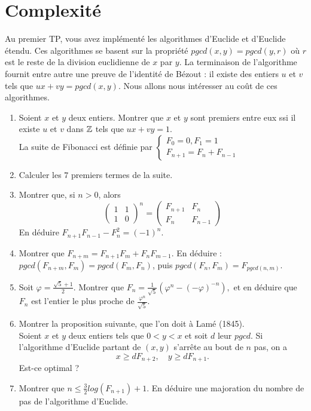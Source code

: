 \section{Complexité}

Au premier TP, vous avez implémenté les algorithmes d'Euclide et d'Euclide étendu. Ces algorithmes se basent sur la propriété $pgcd(x,y)=pgcd(y,r)$ où $r$ est le reste de la division euclidienne de $x$ par $y$. La terminaison de l'algorithme fournit entre autre une preuve de l'identité de Bézout : il existe des entiers $u$ et $v$ tels que $ux+vy=pgcd(x,y)$. Nous allons nous intéresser au coût de ces algorithmes.

\begin{enumerate}
\item Soient $x$ et $y$ deux entiers. Montrer que $x$ et $y$ sont premiers entre eux ssi il existe $u$ et $v$ dans $\mathbb Z$ tels que $ux+vy=1$.\\ 

La suite de Fibonacci est définie par 
$\left\{\begin{array}{c} F_0 = 0, F_1 = 1\\
F_{n+1}=F_n+F_{n-1}\end{array}\right.$

\item Calculer les $7$ premiers termes de la suite.
\item Montrer que, si $n>0$, alors 
\[\begin{pmatrix}1 & 1 \\ 1 & 0\end{pmatrix}^n = \begin{pmatrix}F_{n+1} & F_n \\ F_n & F_{n-1}\end{pmatrix}\]
En déduire $F_{n+1}F_{n-1}-F_n^2 = (-1)^n$.
\item Montrer que $F_{n+m} = F_{n+1}F_m+F_n F_{m-1}$. En déduire : $pgcd(F_{n+m},F_m)= pgcd(F_m,F_n)$, puis $pgcd(F_n,F_m)=F_{pgcd(n,m)}$.
\item Soit $\varphi = \frac{\sqrt{5}+1}{2}$. Montrer que 
$F_n= \frac{1}{\sqrt{5}}(\varphi^n-(-\varphi)^{-n}),$
et en déduire que $F_n$ est l'entier le plus proche de $\frac{\varphi^n}{\sqrt 5}$.
\item Montrer la proposition suivante, que l'on doit à Lamé (1845). \\
Soient $x$ et $y$ deux entiers tels que $0<y<x$ et soit $d$ leur $pgcd$. Si l'algorithme d'Euclide partant de $(x,y)$ s'arrête au bout de $n$ pas, on a 
\[x \geq d F_{n+2}, \quad y \geq d F_{n+1}.\]
Est-ce optimal ?
\item Montrer que $n\leq \frac{3}{2} log (F_{n+1})+1$. En déduire une majoration du nombre de pas de l'algorithme d'Euclide.\\


\end{enumerate}
